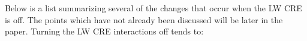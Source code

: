 \documentclass[11pt]{article}   	%
\begin{document}

Below is a list summarizing several of the changes that occur when the LW CRE is off.  The points which have not already been discussed will be later in the paper.   Turning the LW CRE interactions off tends to: 
\end{document}
